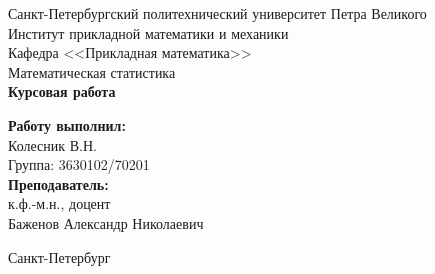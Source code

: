 \begin{titlepage}	%

	\begin{center}		%

		\large Санкт-Петербургский политехнический университет Петра Великого\\
		\large Институт прикладной математики и механики \\
		\large Кафедра <<Прикладная математика>>\\[6cm]
		
		\huge Математическая статистика\\[0.5cm] %
		\large \textbf{Курсовая работа}\\[5.1cm]

	\end{center}


	\begin{flushright} %
		\begin{minipage}{0.25\textwidth} %
			\begin{flushleft} %

				\large\textbf{Работу выполнил:}\\
				\large Колесник В.Н.\\
				\large {Группа:} 3630102/70201\\
				
				\large \textbf{Преподаватель:}\\
				\large к.ф.-м.н., доцент\\
				\large Баженов Александр Николаевич

			\end{flushleft}
		\end{minipage}
	\end{flushright}
	
	\vfill %

	\begin{center}
	\large Санкт-Петербург\\
	\large \the\year %
	\end{center} %

\end{titlepage} %

\vfill %
